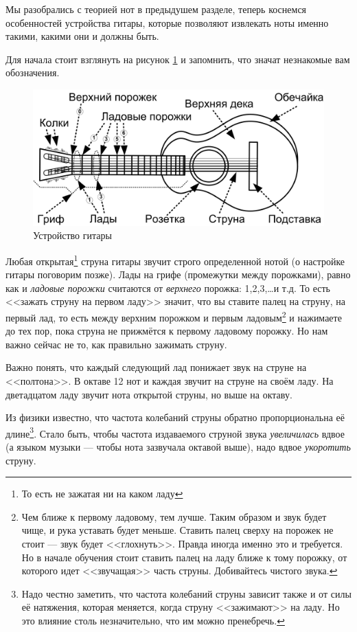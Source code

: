 Мы разобрались с теорией нот в предыдушем разделе, теперь коснемся особенностей устройства гитары, которые позволяют извлекать ноты именно такими, какими они и должны быть. 

Для начала стоит взглянуть на рисунок \ref{fig:guitarConstruction} и запомнить, что значат незнакомые вам обозначения.

\begin{figure}[!ht]
    \centering
    \includegraphics{fig/guitar-construction} 
    \caption{Устройство гитары}\label{fig:guitarConstruction}
\end{figure} 

Любая открытая\footnote{То есть не зажатая ни на каком ладу} струна гитары звучит строго определенной нотой (о настройке гитары поговорим позже). Лады на грифе (промежутки между порожками), равно как и \emph{ладовые порожки} считаются от \emph{верхнего} порожка: 1,2,3,\ldots и т.д. То есть <<зажать струну на первом ладу>> значит, что вы ставите палец на струну, на первый лад, то есть между верхним порожком и первым ладовым\footnote{Чем ближе к первому ладовому, тем лучше. Таким образом и звук будет чище, и рука уставать будет меньше. Ставить палец сверху на порожек не стоит --- звук будет <<глохнуть>>. Правда иногда именно это и требуется. Но в начале обучения стоит ставить палец на ладу ближе к тому порожку, от которого идет <<звучащая>> часть струны. Добивайтесь чистого звука.} и нажимаете до тех пор, пока струна не прижмётся к первому ладовому порожку. Но нам важно сейчас не то, как правильно зажимать струну. 

Важно понять, что каждый следующий лад понижает звук на струне на <<полтона>>. В октаве 12 нот и каждая звучит на струне на своём ладу. На дветадцатом ладу звучит нота открытой струны, но выше на октаву.

Из физики известно, что частота колебаний струны обратно пропорциональна её длине\footnote{Надо честно заметить, что частота колебаний струны зависит также и от силы её натяжения, которая меняется, когда струну <<зажимают>> на ладу. Но это влияние столь незначительно, что им можно пренебречь.}. Стало быть, чтобы частота издаваемого струной звука \emph{увеличилась} вдвое (а языком музыки --- чтобы нота зазвучала октавой выше), надо вдвое \emph{укоротить} струну. 

